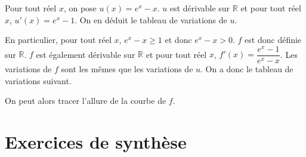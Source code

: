 \documentclass[11pt,fleqn, openany]{book} %
\begin{document}
\begin{solution}Pour tout réel $x$, on pose $u(x)=e^x-x$. $u$ est dérivable sur $\mathbb{R}$ et pour tout réel $x$, $u'(x)=e^x-1$. On en déduit le tableau de variations de $u$.
	

\begin{center}
\end{center}


En particulier, pour tout réel $x$, $e^x-x\geqslant 1$ et donc $e^x-x>0$. $f$ est donc définie sur $\mathbb{R}$. $f$ est également dérivable sur $\mathbb{R}$ et pour tout réel $x$, $f'(x)=\dfrac{e^x-1}{e^x-x}$. Les variations de $f$ sont les mêmes que les variations de $u$. On a donc le tableau de variations suivant.

\begin{center}
\end{center}

On peut alors tracer l'allure de la courbe de $f$.

\begin{center}
\end{center}

\end{solution}


\section*{Exercices de synthèse}
\end{document}
